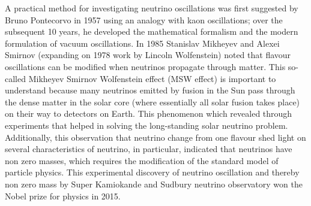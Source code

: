 \documentclass[12pt,a4paper]{report}
\begin{document}
A practical method for investigating neutrino oscillations was first suggested by Bruno Pontecorvo in 1957 using an analogy with kaon oscillations; over the subsequent 10 years, he developed the mathematical formalism and the modern formulation of vacuum oscillations. In 1985 Stanislav Mikheyev and Alexei Smirnov (expanding on 1978 work by Lincoln Wolfenstein) noted that flavour oscillations can be modified when neutrinos propagate through matter. This so-called Mikheyev Smirnov Wolfenstein effect (MSW effect) is important to understand because many neutrinos emitted by fusion in the Sun pass through the dense matter in the solar core (where essentially all solar fusion takes place) on their way to detectors on Earth. This phenomenon which revealed through experiments that helped in solving the long-standing solar neutrino problem. Additionally, this observation that neutrino change from one flavour shed light on several characteristics of neutrino, in particular, indicated that neutrinos have non zero masses, which requires the modification of the standard model of particle physics. This experimental discovery of neutrino oscillation and thereby non zero mass by Super Kamiokande and Sudbury neutrino observatory won the Nobel prize for physics in 2015.
\end{document}
